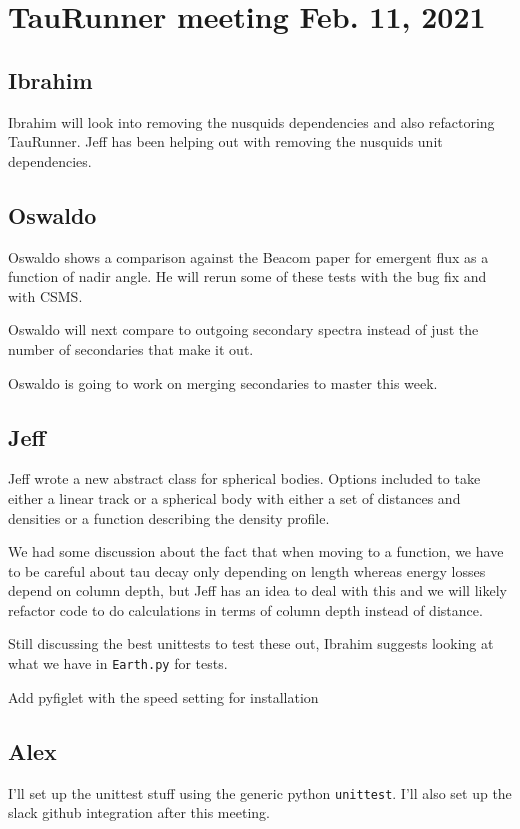 \chapter{TauRunner meeting Feb. 11, 2021}

\section{Ibrahim}
Ibrahim will look into removing the nusquids dependencies and also refactoring TauRunner. Jeff has been helping out with removing the nusquids unit dependencies.

\section{Oswaldo}
Oswaldo shows a comparison against the Beacom paper for emergent flux as a function of nadir angle. He will rerun some of these tests with the bug fix and with CSMS. 

Oswaldo will next compare to outgoing secondary spectra instead of just the number of secondaries that make it out. 

Oswaldo is going to work on merging secondaries to master this week.

\section{Jeff}
Jeff wrote a new abstract class for spherical bodies. Options included to take either a linear track or a spherical body with either a set of distances and densities or a function describing the density profile. 

We had some discussion about the fact that when moving to a function, we have to be careful about tau decay only depending on length whereas energy losses depend on column depth, but Jeff has an idea to deal with this and we will likely refactor code to do calculations in terms of column depth instead of distance.

Still discussing the best unittests to test these out, Ibrahim suggests looking at what we have in \texttt{Earth.py} for tests.

Add pyfiglet with the speed setting for installation

\section{Alex}
I'll set up the unittest stuff using the generic python \texttt{unittest}. I'll also set up the slack github integration after this meeting.

